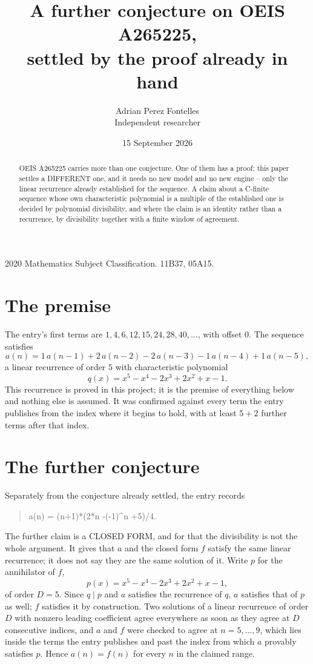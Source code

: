 \documentclass[11pt,a4paper]{article}
\title{A further conjecture on OEIS A265225,\\ \large settled by the proof already in hand}
\author{Adrian Perez Fontelles\\ \small Independent researcher}
\date{15 September 2026}
\theoremstyle{plain}
\theoremstyle{definition}
\begin{document}
\maketitle

\begin{abstract}
OEIS A265225 carries more than one conjecture. One of them has a proof; this paper settles a
DIFFERENT one, and it needs no new model and no new engine -- only the linear recurrence already
established for the sequence. A claim about a C-finite sequence whose own characteristic
polynomial is a multiple of the established one is decided by polynomial divisibility, and where
the claim is an identity rather than a recurrence, by divisibility together with a finite window
of agreement.
\end{abstract}

\noindent\small 2020 Mathematics Subject Classification. 11B37, 05A15.\normalsize

\section{The premise}

The entry's first terms are $1, 4, 6, 12, 15, 24, 28, 40,\dots$, with offset $0$. The sequence satisfies
\[
  a(n)=1\,a(n-1) + 2\,a(n-2) - 2\,a(n-3) - 1\,a(n-4) + 1\,a(n-5) ,
\]
a linear recurrence of order $5$ with characteristic polynomial
\[
  q(x)=x^{5} - x^{4} - 2 x^{3} + 2 x^{2} + x - 1 .
\]
This recurrence is proved in this project; it is the premise of everything below and nothing else is assumed.
It was confirmed against every term the entry publishes from the index where it begins to hold,
with at least $5+2$ further terms after that index.

\section{The further conjecture}

Separately from the conjecture already settled, the entry records

\begin{quote}\raggedright a(n) = (n+1)*(2*n -(-1)\^{}n +5)/4.\end{quote}

The further claim is a CLOSED FORM, and for that the divisibility is not the whole argument. It
gives that $a$ and the closed form $f$ satisfy the same linear recurrence; it does not say they
are the same solution of it. Write $p$ for the annihilator of $f$,
\[
  p(x)=x^{5} - x^{4} - 2 x^{3} + 2 x^{2} + x - 1 ,
\]
of order $D=5$. Since $q\mid p$ and $a$ satisfies the recurrence of $q$, $a$ satisfies that of
$p$ as well; $f$ satisfies it by construction. Two solutions of a linear recurrence of order $D$
with nonzero leading coefficient agree everywhere as soon as they agree at $D$ consecutive
indices, and $a$ and $f$ were checked to agree at $n=5,\dots,9$,
which lies inside the terms the entry publishes and past the index from which $a$ provably
satisfies $p$. Hence $a(n)=f(n)$ for every $n$ in the claimed range.
\end{document}
